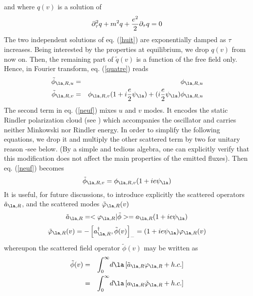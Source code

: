 and where $q(v)$ is a solution of
\begin{equation}
\partial_{ \tau} ^2 q +  m ^2 q + {e^2  \over 2} \partial_{
\tau}q = 0
\label{huit}
\end{equation}
The two independent solutions of  eq. (\ref{huit}) are exponentially
damped as $ \tau$
increases. Being interested by the properties at equilibrium, we drop
$q(v)$ from now on. Then, the remaining part of $ \tilde q(v)$ is a function
of the free field only. Hence, in Fourier transform, eq. (\ref{quatre})
reads
\begin{eqnarray}
\tilde  \phi _{ \la,R,u} &=&  \phi _{ \la,R,u}
\nonumber\\
\tilde  \phi _{ \la,R,v} &=&  \phi _{ \la,R,v} (1+ i{e\over 2} \psi _{ \la})+
(i{e\over 2} \psi _{ \la})  \phi _{
\la,R,u}
\label{neuf}
\end{eqnarray}
The second term in eq. (\ref{neuf}) mixes $u$ and $v$ modes. It encodes the
static Rindler polarization cloud (see \cite{Unru2} \cite{mpbrsg})
which accompanies the
oscillator and carries
neither
Minkowski nor Rindler energy. In order to simplify the following
equations, we drop it and multiply the other scattered term by two
for unitary reason -see
below. (By a simple and tedious algebra, one can
explicitly verify that this modification does not
affect the main properties
of the emitted fluxes). Then  eq. (\ref{neuf}) becomes
\begin{equation}
\tilde  \phi _{ \la,R,v} =  \phi _{ \la,R,v} (1+ ie\psi _{ \la})
\label{dix}
\end{equation}
It is useful, for future discussions, to introduce explicitly the
scattered operators  $\tilde a_{\la,R}$,
and the scattered modes $\tilde \varphi_{\la,R} (v)$
\begin{equation}
\tilde a_{\la,R} =  < \varphi_{\la,R} |  \tilde  \phi > =
a_{\la,R}(1+ ie\psi _{ \la})
\label{onze}
\end{equation}
\begin{equation}
\tilde \varphi_{\la,R} (v) =- \left[  a_{\la,R}^\dagger,  \tilde  \phi
(v)
\right]_- = (1+ ie\psi _{ \la}) \varphi_{\la,R} (v)
\label{douze}
\end{equation}
whereupon the scattered field operator $\tilde \phi (v)$ may be written as
\begin{eqnarray}
\tilde \phi (v)  &=& \int_0^{\infty}\! d\la  \left[ \tilde a_{\la,R}
\varphi_{\la,R} + h.c.  \right]
\nonumber\\  &=& \int_0^{\infty}\! d\la
\left[ a_{\la,R} \tilde \varphi_{\la,R} +  h.c. \right]
\label{treize}
\end{eqnarray}
